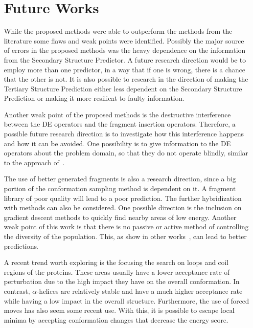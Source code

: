 \section{Future Works}\label{sec:future_works}

While the proposed methods were able to outperform the methods from the literature some flaws and weak points were identified. Possibly the major source of errors in the proposed methods was the heavy dependence on the information from the Secondary Structure Predictor. A future research direction would be to employ more than one predictor, in a way that if one is wrong, there is a chance that the other is not. It is also possible to research in the direction of making the Tertiary Structure Prediction either less dependent on the Secondary Structure Prediction or making it more resilient to faulty information.

Another weak point of the proposed methods is the destructive
interference between the DE operators and the fragment insertion
operators. Therefore, a possible future research direction is to
investigate how this interference happens and how it can be avoided.
One possibility is to give information to the DE operators
about the problem domain, so that they do not operate blindly,
similar to the approach of~\cite{borguesan2015apl}.

The use of better generated fragments is also a research direction,
since a big portion of the conformation sampling method is dependent
on it. A fragment library of poor quality will lead to a poor
prediction.
The further hybridization with methods can also be considered.
One possible direction is the inclusion on gradient descent methods
to quickly find nearby areas of low energy.
Another weak point of this work is that there is no passive or active method of controlling the diversity of the population. This, as show
in other works~\cite{narloch2016diversification,simoncini2017balancing},
can lead to better predictions.

A recent trend worth exploring is the focusing the search on loops and
coil regions of the proteins. These areas usually have a lower acceptance rate
of perturbation due to the high impact they have on the overall conformation.
In contrast, $\alpha$-helices are relatively stable and have a much higher
acceptance rate while having a low impact in the overall structure. Furthermore,
the use of forced moves has also seem some recent use. With this, it is possible
to escape local minima by accepting conformation changes that decrease the 
energy score.

